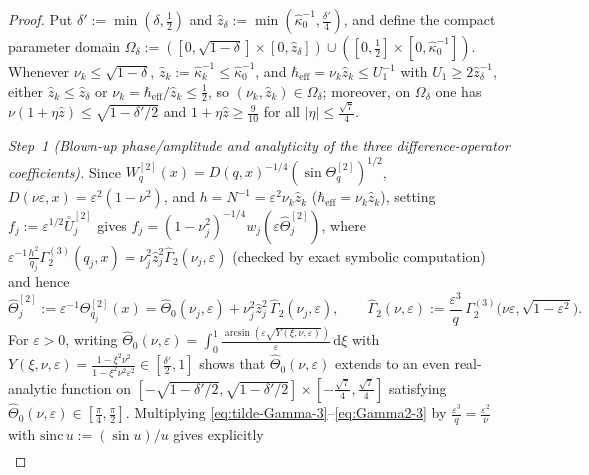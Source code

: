 \documentclass[11pt]{article}
\theoremstyle{definition}
\theoremstyle{remark}
\newcommand{\dd}{\mathrm{d}}
\newcommand{\heff}{\hbar_{\mathrm{eff}}}
\renewcommand{\_}{\oldunderscore\penalty0\hskip0pt\relax}
\begin{document}
\begin{proof}
Put $\delta':=\min(\delta,\frac12)$ and $\hat{z}_\delta:=\min(\hat{\kappa}_0^{-1},\frac{\delta'}{4})$, and define the compact
  parameter domain $\Omega_\delta:=([0,\sqrt{1-\delta}]\times[0,\hat{z}_\delta])\cup([0,\frac12]\times[0,\hat{\kappa}_0^{-1}])$.
  Whenever $\nu_k\le\sqrt{1-\delta}$, $\hat{z}_k:=\hat{\kappa}_k^{-1}\le\hat{\kappa}_0^{-1}$, and $\heff=\nu_k\hat{z}_k\le
  U_1^{-1}$ with $U_1\ge 2\hat{z}_\delta^{-1}$, either $\hat{z}_k\le\hat{z}_\delta$ or $\nu_k=\heff/\hat{z}_k\le\frac12$, so
  $(\nu_k,\hat{z}_k)\in\Omega_\delta$; moreover, on $\Omega_\delta$ one has $\nu(1+\eta\hat{z})\le\sqrt{1-\delta'/2}$ and
  $1+\eta\hat{z}\ge\frac{9}{10}$ for all $|\eta|\le\frac{\sqrt{7}}{4}$.

\emph{Step~1 (Blown-up phase/amplitude and analyticity of the three difference-operator coefficients).}
Since $W_q^{[2]}(x)=D(q,x)^{-1/4}(\sin\Theta_q^{[2]})^{1/2}$, $D(\nu\varepsilon,x)=\varepsilon^2(1-\nu^2)$, and
  $h=N^{-1}=\varepsilon^2\nu_k\hat{z}_k$ ($\heff=\nu_k\hat{z}_k$), setting $f_j:=\varepsilon^{1/2}\stackrel{\circ}{U}_j^{[2]}$
  gives $f_j=(1-\nu_j^2)^{-1/4}w_j(\varepsilon\widehat{\Theta}_j^{[2]})$, where
  $\varepsilon^{-1}\frac{h^2}{q_j}\Gamma_2^{(3)}(q_j,x)=\nu_j^2\hat{z}_j^2\widehat{\Gamma}_2(\nu_j,\varepsilon)$ (checked
  by exact symbolic computation) and hence
\begin{equation}
  \widehat{\Theta}_j^{[2]} := \varepsilon^{-1}\Theta_{q_j}^{[2]}(x) = \widehat{\Theta}_0(\nu_j,\varepsilon) + \nu_j^2\hat{z}_j^2\,\widehat{\Gamma}_2(\nu_j,\varepsilon),\qquad
  \widehat{\Gamma}_2(\nu,\varepsilon) := \frac{\varepsilon^3}{q}\,\Gamma_2^{(3)}\bigl(\nu\varepsilon,\sqrt{1-\varepsilon^2}\bigr).
  \label{eq:Theta-hat-2}
\end{equation}
For $\varepsilon>0$, writing
  $\widehat{\Theta}_0(\nu,\varepsilon)=\int_0^1\frac{\arcsin(\varepsilon\sqrt{Y(\xi,\nu,\varepsilon)})}{\varepsilon}\,\dd\xi$
  with $Y(\xi,\nu,\varepsilon)=\frac{1-\xi^2\nu^2}{1-\xi^2\nu^2\varepsilon^2}\in[\frac{\delta'}{2},1]$ shows that
  $\widehat{\Theta}_0(\nu,\varepsilon)$ extends to an even real-analytic function on
  $[-\sqrt{1-\delta'/2},\sqrt{1-\delta'/2}]\times[-\frac{\sqrt{7}}{4},\frac{\sqrt{7}}{4}]$ satisfying
  $\widehat{\Theta}_0(\nu,\varepsilon)\in[\frac{\pi}{4},\frac{\pi}{2}]$. Multiplying
  \eqref{eq:tilde-Gamma-3}--\eqref{eq:Gamma2-3} by $\frac{\varepsilon^3}{q}=\frac{\varepsilon^2}{\nu}$ with
  $\mathrm{sinc}\,u:=(\sin u)/u$ gives explicitly
\begin{equation}
\begin{aligned}

\end{aligned}
\end{equation}
\end{proof}
\end{document}
